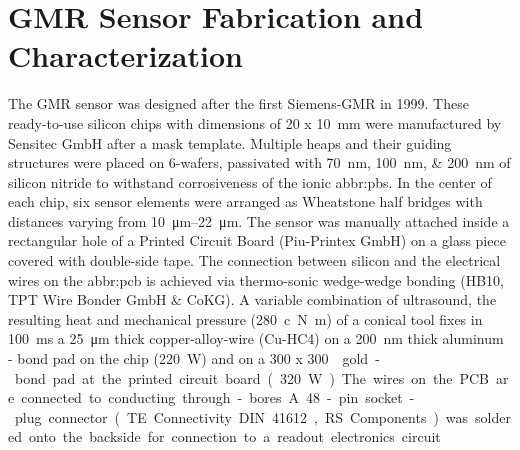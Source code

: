 \section{GMR Sensor Fabrication and Characterization}
The GMR sensor was designed after the first Siemens-GMR  in 1999.\cite{patent:GMR} These ready-to-use silicon chips with dimensions of 20 x \SI{10}{\milli\meter} were manufactured by Sensitec GmbH after a mask template.  Multiple heaps and their guiding structures were placed on \SI{6}{\inch}-wafers, passivated with \SIlist{70;100;200}{\nano\meter} of silicon nitride to withstand corrosiveness of the ionic \acrfull{abbr:pbs}. In the center of each chip, six sensor elements were arranged as Wheatstone half bridges with distances varying from \SIrange{10}{22}{\micro\meter}. The sensor was manually attached inside a rectangular hole of a Printed Circuit Board (Piu-Printex GmbH) on a glass piece covered with double-side tape. The connection between silicon and the electrical wires on the \acrfull{abbr:pcb} is achieved via thermo-sonic wedge-wedge bonding (HB10, TPT Wire Bonder GmbH \& CoKG). A variable combination of ultrasound, the resulting heat and mechanical pressure (\SI{280}{c\newton\meter}) of a conical tool fixes in \SI{100}{\milli\second} a \SI{25}{\micro\meter} thick copper-alloy-wire (Cu-HC4) on a \SI{200}{\nano\meter} thick aluminum - bond pad on the chip (\SI{220}{\watt}) and on a 300 x \SI{300}{\micro\meter\square} gold - bond pad at the printed circuit board (\SI{320}{\watt}). The wires on the PCB are connected to conducting through-bores. A 48-pin socket-plug connector (TE Connectivity DIN 41612, RS Components) was soldered onto the backside for connection to a readout electronics circuit.
\newpage
